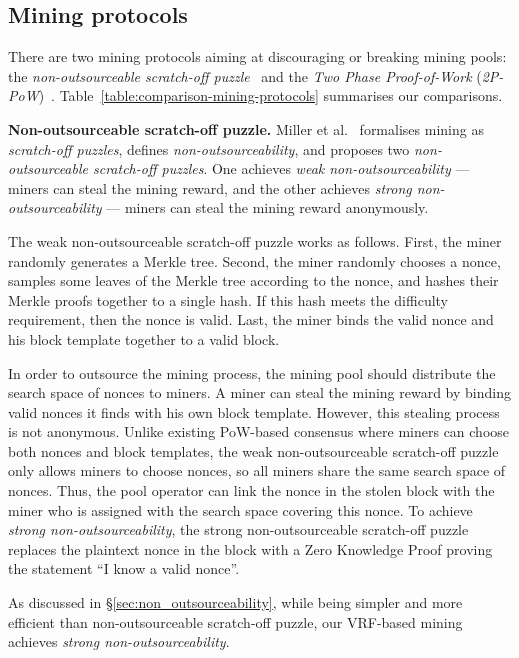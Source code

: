 \subsection{Mining protocols}

There are two mining protocols aiming at discouraging or breaking mining pools: the \textit{non-outsourceable scratch-off puzzle}~\cite{miller2015nonoutsourceable} and the \textit{Two Phase Proof-of-Work} (\textit{2P-PoW})~\cite{2P-PoW}.
Table~\ref{table:comparison-mining-protocols} summarises our comparisons.

\textbf{Non-outsourceable scratch-off puzzle.}
Miller et al.~\cite{miller2015nonoutsourceable} formalises mining as \emph{scratch-off puzzles}, defines \emph{non-outsourceability}, and proposes two \emph{non-outsourceable scratch-off puzzles}.
One achieves \emph{weak non-outsourceability} --- miners can steal the mining reward, and the other achieves \emph{strong non-outsourceability} --- miners can steal the mining reward anonymously.

The weak non-outsourceable scratch-off puzzle works as follows.
First, the miner randomly generates a Merkle tree.
Second, the miner randomly chooses a nonce, samples some leaves of the Merkle tree according to the nonce, and hashes their Merkle proofs together to a single hash.
If this hash meets the difficulty requirement, then the nonce is valid.
Last, the miner binds the valid nonce and his block template together to a valid block.

In order to outsource the mining process, the mining pool should distribute the search space of nonces to miners.
A miner can steal the mining reward by binding valid nonces it finds with his own block template.
However, this stealing process is not anonymous.
Unlike existing PoW-based consensus where miners can choose both nonces and block templates, the weak non-outsourceable scratch-off puzzle only allows miners to choose nonces, so all miners share the same search space of nonces.
Thus, the pool operator can link the nonce in the stolen block with the miner who is assigned with the search space covering this nonce.
To achieve \emph{strong non-outsourceability}, the strong non-outsourceable scratch-off puzzle replaces the plaintext nonce in the block with a Zero Knowledge Proof proving the statement ``I know a valid nonce''.

As discussed in \S\ref{sec:non_outsourceability}, while being simpler and more efficient than non-outsourceable scratch-off puzzle, our VRF-based mining achieves \emph{strong non-outsourceability}.

